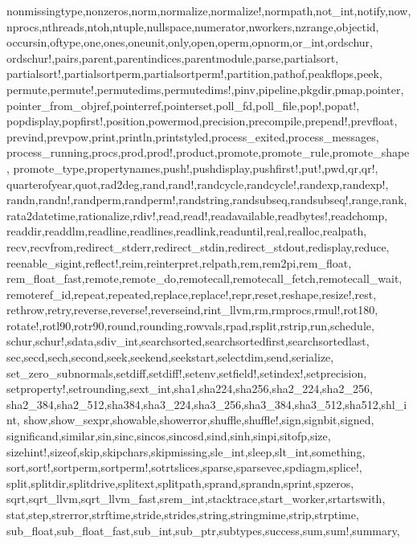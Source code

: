 {{nonmissingtype,nonzeros,norm,normalize,normalize!,normpath,not_int,notify,now,%
nprocs,nthreads,ntoh,ntuple,nullspace,numerator,nworkers,nzrange,objectid,%
occursin,oftype,one,ones,oneunit,only,open,operm,opnorm,or_int,ordschur,%
ordschur!,pairs,parent,parentindices,parentmodule,parse,partialsort,%
partialsort!,partialsortperm,partialsortperm!,partition,pathof,peakflops,peek,%
permute,permute!,permutedims,permutedims!,pinv,pipeline,pkgdir,pmap,pointer,%
pointer_from_objref,pointerref,pointerset,poll_fd,poll_file,pop!,popat!,%
popdisplay,popfirst!,position,powermod,precision,precompile,prepend!,prevfloat,%
prevind,prevpow,print,println,printstyled,process_exited,process_messages,%
process_running,procs,prod,prod!,product,promote,promote_rule,promote_shape,%
promote_type,propertynames,push!,pushdisplay,pushfirst!,put!,pwd,qr,qr!,%
quarterofyear,quot,rad2deg,rand,rand!,randcycle,randcycle!,randexp,randexp!,%
randn,randn!,randperm,randperm!,randstring,randsubseq,randsubseq!,range,rank,%
rata2datetime,rationalize,rdiv!,read,read!,readavailable,readbytes!,readchomp,%
readdir,readdlm,readline,readlines,readlink,readuntil,real,realloc,realpath,%
recv,recvfrom,redirect_stderr,redirect_stdin,redirect_stdout,redisplay,reduce,%
reenable_sigint,reflect!,reim,reinterpret,relpath,rem,rem2pi,rem_float,%
rem_float_fast,remote,remote_do,remotecall,remotecall_fetch,remotecall_wait,%
remoteref_id,repeat,repeated,replace,replace!,repr,reset,reshape,resize!,rest,%
rethrow,retry,reverse,reverse!,reverseind,rint_llvm,rm,rmprocs,rmul!,rot180,%
rotate!,rotl90,rotr90,round,rounding,rowvals,rpad,rsplit,rstrip,run,schedule,%
schur,schur!,sdata,sdiv_int,searchsorted,searchsortedfirst,searchsortedlast,%
sec,secd,sech,second,seek,seekend,seekstart,selectdim,send,serialize,%
set_zero_subnormals,setdiff,setdiff!,setenv,setfield!,setindex!,setprecision,%
setproperty!,setrounding,sext_int,sha1,sha224,sha256,sha2_224,sha2_256,%
sha2_384,sha2_512,sha384,sha3_224,sha3_256,sha3_384,sha3_512,sha512,shl_int,%
show,show_sexpr,showable,showerror,shuffle,shuffle!,sign,signbit,signed,%
significand,similar,sin,sinc,sincos,sincosd,sind,sinh,sinpi,sitofp,size,%
sizehint!,sizeof,skip,skipchars,skipmissing,sle_int,sleep,slt_int,something,%
sort,sort!,sortperm,sortperm!,sotrtslices,sparse,sparsevec,spdiagm,splice!,%
split,splitdir,splitdrive,splitext,splitpath,sprand,sprandn,sprint,spzeros,%
sqrt,sqrt_llvm,sqrt_llvm_fast,srem_int,stacktrace,start_worker,srtartswith,%
stat,step,strerror,strftime,stride,strides,string,stringmime,strip,strptime,%
sub_float,sub_float_fast,sub_int,sub_ptr,subtypes,success,sum,sum!,summary,%
}}
